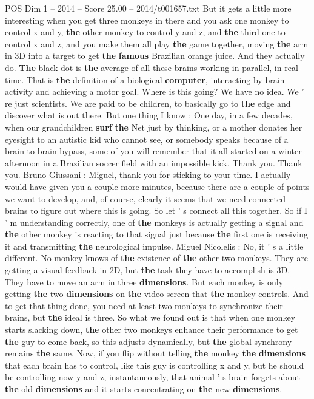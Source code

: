 \begin{textsample}{POS Dim 1 – 2014 – Score 25.00 – 2014/t001657.txt}
But it gets a little more interesting when you get three monkeys in there and you ask one monkey to control x and y, \textbf{the} other monkey to control y and z, and \textbf{the} third one to control x and z, and you make them all play \textbf{the} game together, moving \textbf{the} arm in 3D into a target to get \textbf{the} \textbf{famous} Brazilian orange juice.
And they actually do. \textbf{The} black dot is \textbf{the} average of all these brains working in parallel, in real time.
That is \textbf{the} definition of a biological \textbf{computer}, interacting by brain activity and achieving a motor goal.
Where is this going?
We have no idea.
We ' re just scientists.
We are paid to be children, to basically go to \textbf{the} edge and discover what is out there.
But one thing I know : One day, in a few decades, when our grandchildren \textbf{surf} \textbf{the} Net just by thinking, or a mother donates her eyesight to an autistic kid who cannot see, or somebody speaks because of a brain-to-brain bypass, some of you will remember that it all started on a winter afternoon in a Brazilian soccer field with an impossible kick.
Thank you.
Thank you.
Bruno Giussani : Miguel, thank you for sticking to your time.
I actually would have given you a couple more minutes, because there are a couple of points we want to develop, and, of course, clearly it seems that we need connected brains to figure out where this is going.
So let ' s connect all this together.
So if I ' m understanding correctly, one of \textbf{the} monkeys is actually getting a signal and \textbf{the} other monkey is reacting to that signal just because \textbf{the} first one is receiving it and transmitting \textbf{the} neurological impulse.
Miguel Nicolelis : No, it ' s a little different.
No monkey knows of \textbf{the} existence of \textbf{the} other two monkeys.
They are getting a visual feedback in 2D, but \textbf{the} task they have to accomplish is 3D.
They have to move an arm in three \textbf{dimensions}.
But each monkey is only getting \textbf{the} two \textbf{dimensions} on \textbf{the} video screen that \textbf{the} monkey controls.
And to get that thing done, you need at least two monkeys to synchronize their brains, but \textbf{the} ideal is three.
So what we found out is that when one monkey starts slacking down, \textbf{the} other two monkeys enhance their performance to get \textbf{the} guy to come back, so this adjusts dynamically, but \textbf{the} global synchrony remains \textbf{the} same.
Now, if you flip without telling \textbf{the} monkey \textbf{the} \textbf{dimensions} that each brain has to control, like this guy is controlling x and y, but he should be controlling now y and z, instantaneously, that animal ' s brain forgets about \textbf{the} old \textbf{dimensions} and it starts concentrating on \textbf{the} new \textbf{dimensions}.

\end{textsample}
